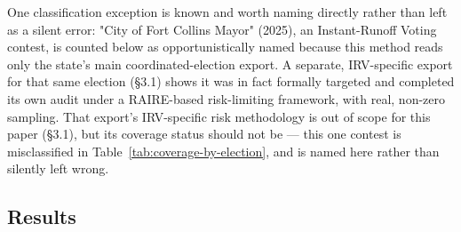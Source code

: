 One classification exception is known and worth naming directly rather
than left as a silent error: "City of Fort Collins Mayor" (2025), an
Instant-Runoff Voting contest, is counted below as opportunistically
named because this method reads only the state's main coordinated-election
export. A separate, IRV-specific export for that same election (§3.1)
shows it was in fact formally targeted and completed its own audit under
a RAIRE-based risk-limiting framework, with real, non-zero sampling. That
export's IRV-specific risk methodology is out of scope for this paper
(§3.1), but its coverage status should not be — this one contest is
misclassified in Table~\ref{tab:coverage-by-election}, and is named here
rather than silently left wrong.

\subsection{Results}

\begin{table}[t]\centering
{}
\caption{Contest coverage classification by election, and by county span. \label{tab:coverage-by-election}}
\end{table}

